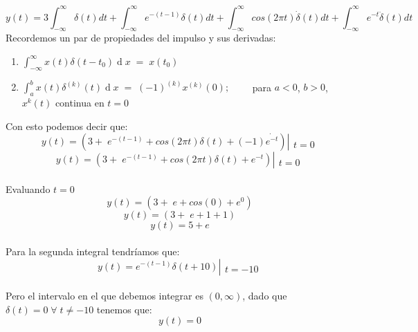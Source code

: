 \documentclass[10pt,a4paper]{report}
\begin{document}
\[
y(t)=3\int_{-\infty }^{\infty }\delta (t)dt+\int_{-\infty }^{\infty }e^{-(t-1)}\delta (t)dt+\int_{-\infty }^{\infty }cos(2\pi t)\dot{\delta}(t)dt+\int_{-\infty }^{\infty }e^{-t}\ddot{\delta}(t)dt
\]
Recordemos un par de propiedades del impulso y sus derivadas:
\begin{enumerate}
  \item $\int_{-\infty}^\infty x\left(t\right)\delta\left(t-t_0\right)\operatorname dx\;=\;x\left(t_0\right)$
  \item $\int_a^bx\left(t\right)\delta^{\left(k\right)}\left(t\right)\operatorname dx\;=\;\left(-1\right)^{\left(k\right)}x^{\left(k\right)}\left(0\right); \qquad$ para $a<0$, $b>0$, $x^k\left(t\right)$ continua en $t=0$
\end{enumerate}
Con esto podemos decir que:\\
\[ y\left(t\right) = \left(3+\;e^{-\left(t-1\right)}+cos\left(2\pi t\right)\delta\left(t\right)+\left(-1\right)\dot{e^{-t}}\right)\left|\begin{array}{l}\\t=0\end{array}\right. \]
\[ y\left(t\right) = \left(3+\;e^{-\left(t-1\right)}+cos\left(2\pi t\right)\delta\left(t\right)+{e^{-t}}\right)\left|\begin{array}{l}\\t=0\end{array}\right. \]\\
Evaluando $t=0$
\[ y\left(t\right) = \left(3+\;e+cos\left(0\right)+e^0\right) \]
\[ y\left(t\right) = \left(3+\;e+1+1\right) \]
\[ y\left(t\right) = 5+e \]\\
Para la segunda integral tendríamos que:
\[ y\left(t\right)= e^{-\left(t-1\right)}\delta\left(t+10\right)\left|\begin{array}{l}\\t=-10\end{array}\right. \]\\
Pero el intervalo en el que debemos integrar es $\left(0,\infty\right)$, dado que $\delta\left(t\right) = 0 \; \forall \; t \neq -10$ tenemos que:
\[ y\left(t\right)= 0 \] 
\end{document}
